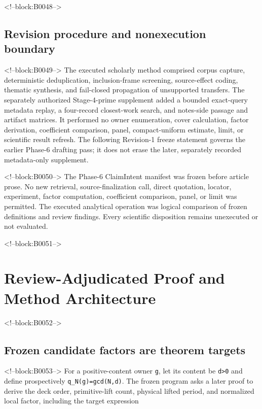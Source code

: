 \documentclass[11pt]{article}
\begin{document}
<!--block:B0048-->
\hypertarget{32-revision-procedure-and-nonexecution-boundary}{%
\subsection{Revision procedure and nonexecution
boundary}\label{32-revision-procedure-and-nonexecution-boundary}}

<!--block:B0049-->
The executed scholarly method comprised corpus capture, deterministic
deduplication, inclusion-frame screening, source-effect coding, thematic
synthesis, and fail-closed propagation of unsupported transfers.  The separately
authorized Stage-4-prime supplement added a bounded exact-query metadata replay,
a four-record closest-work search, and notes-side passage and artifact matrices.
It performed no owner enumeration, cover calculation, factor derivation,
coefficient comparison, panel, compact-uniform estimate, limit, or scientific
result refresh.  The following Revision-1 freeze statement governs the earlier
Phase-6 drafting pass; it does not erase the later, separately recorded
metadata-only supplement.

<!--block:B0050-->
The Phase-6 ClaimIntent manifest was frozen before article prose. No new
retrieval, source-finalization call, direct quotation, locator,
experiment, factor computation, coefficient comparison, panel, or limit
was permitted. The executed analytical operation was logical comparison
of frozen definitions and review findings. Every scientific disposition
remains unexecuted or not evaluated.

<!--block:B0051-->
\hypertarget{4-review-adjudicated-proof-and-method-architecture}{%
\section{Review-Adjudicated Proof and Method
Architecture}\label{4-review-adjudicated-proof-and-method-architecture}}

<!--block:B0052-->
\hypertarget{41-frozen-candidate-factors-are-theorem-targets}{%
\subsection{Frozen candidate factors are theorem
targets}\label{41-frozen-candidate-factors-are-theorem-targets}}

<!--block:B0053-->
For a positive-content owner \texttt{g}, let its content be
\texttt{d\textgreater{}0} and define prospectively
\texttt{q\_N(g)=gcd(N,d)}. The frozen program asks a later proof to
derive the deck order, primitive-lift count, physical lifted period, and
normalized local factor, including the target expression
\end{document}
